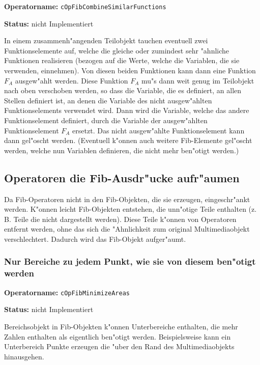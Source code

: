 \textbf{Operatorname:} \verb|cOpFibCombineSimilarFunctions|

\bigskip\noindent
\textbf{Status:} nicht Implementiert

\bigskip\noindent
In einem zusammenh"angenden Teilobjekt tauchen eventuell zwei Funktionselemente auf, welche die gleiche oder zumindest sehr "ahnliche Funktionen realisieren (bezogen auf die Werte, welche die Variablen, die sie verwenden, einnehmen). Von diesen beiden Funktionen kann dann eine Funktion $F_A$ ausgew"ahlt werden. Diese Funktion $F_A$ mu"s dann weit genug im Teilobjekt nach oben verschoben werden, so dass die Variable, die es definiert, an allen Stellen definiert ist, an denen die Variable des nicht ausgew"ahlten Funktionselements verwendet wird. Dann wird die Variable, welche das andere Funktionselement definiert, durch die Variable der ausgew"ahlten Funktionselement $F_A$ ersetzt. Das nicht ausgew"ahlte Funktionselement kann dann gel"oscht werden. (Eventuell k"onnen auch weitere Fib-Elemente gel"oscht werden, welche nun Variablen definieren, die nicht mehr ben"otigt werden.)



\subsection{Operatoren die Fib-Ausdr"ucke aufr"aumen}

Da Fib-Operatoren nicht in den Fib-Objekten, die sie erzeugen, eingeschr"ankt werden. K"onnen leicht Fib-Objekten entstehen, die unn"otige Teile enthalten (z. B. Teile die nicht dargestellt werden). Diese Teile k"onnen von Operatoren entfernt werden, ohne das sich die "Ahnlichkeit zum original Multimediaobjekt verschlechtert. Dadurch wird das Fib-Objekt aufger"aumt.

\subsubsection{Nur Bereiche zu jedem Punkt, wie sie von diesem ben"otigt werden}

\textbf{Operatorname:} \verb|cOpFibMinimizeAreas|

\bigskip\noindent
\textbf{Status:} nicht Implementiert

\bigskip\noindent
Bereichsobjekt in Fib-Objekten k"onnen Unterbereiche enthalten, die mehr Zahlen enthalten als eigentlich ben"otigt werden. Beispielsweise kann ein Unterbereich Punkte erzeugen die "uber den Rand des Multimediaobjekts hinausgehen.

